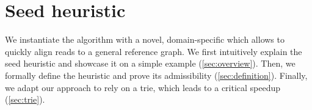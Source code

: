 \section{Seed heuristic} \label{sec:seed_heuristic}
%
We instantiate the \A algorithm with a novel, domain-specific \textit{\seedh}
which allows to quickly align reads to a general reference graph.
%
We first intuitively explain the seed heuristic and showcase it on a simple
example (\cref{sec:overview}). Then, we formally define the heuristic and prove
its admissibility (\cref{sec:definition}).
%
Finally, we adapt our approach to rely on a trie, which leads to a critical
speedup (\cref{sec:trie}).



%
